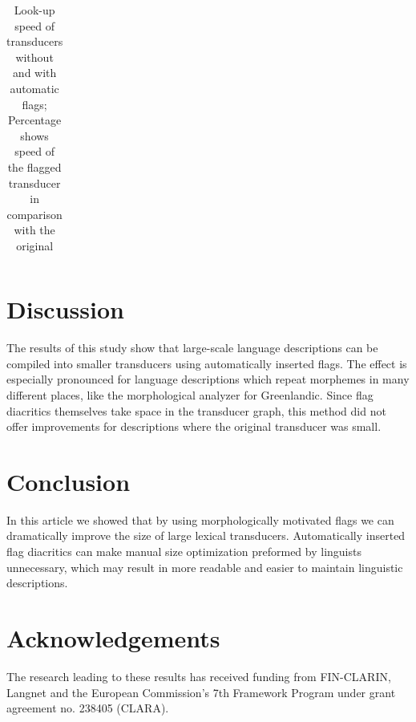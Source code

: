 \documentclass[final]{beamer}
\begin{document}
\begin{poster}
\begin{table}[h]
\begin{tabular}{|l|r|r|r|}
        \hline
    \end{tabular}
    \caption{Look-up speed of transducers without and with automatic flags; Percentage shows speed of the flagged transducer in comparison with the original
    \label{table:lookup}}
\end{table}



\section{Discussion}
\justifying
The results of this study show that large-scale language descriptions
can be compiled into smaller transducers using automatically inserted
flags. The effect is especially pronounced for language descriptions
which repeat morphemes in many different places, like the
morphological analyzer for Greenlandic. Since flag diacritics
themselves take space in the transducer graph, this method did not
offer improvements for descriptions where the original
transducer was small.

\section{Conclusion}

In this article we showed that by using morphologically motivated
flags we can dramatically improve the size of large lexical transducers. Automatically
inserted flag diacritics can make manual size optimization preformed by
linguists unnecessary, which may result in more readable and easier
to maintain linguistic descriptions.


\section{Acknowledgements}
\justifying
The research leading to these results has received funding from FIN-CLARIN, Langnet and the
European Commission's 7th Framework Program under grant agreement no. 238405 (CLARA).

\end{poster}
\end{document}
